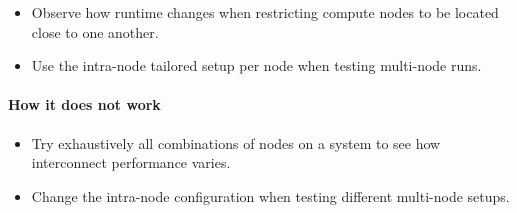 \begin{itemize}[noitemsep]
  \item[$\boxplus$] Observe how runtime changes when restricting compute nodes to be located close to one another.
  \item[$\boxplus$] Use the intra-node tailored setup per node when testing multi-node runs.
\end{itemize}

\paragraph*{How it does not work}

\begin{itemize}[noitemsep]
  \item[$\boxminus$] Try exhaustively all combinations of nodes on a system to see how interconnect performance varies.
  \item[$\boxminus$] Change the intra-node configuration when testing different multi-node setups.
\end{itemize}
